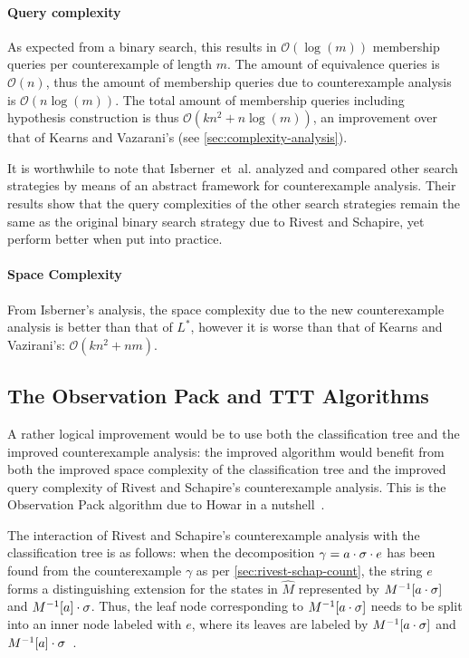\documentclass[multi,crop=false,class=article]{standalone}
\begin{document}
\paragraph{Query complexity} As expected from a binary search, this results in
$\mathcal{O}(\log(m))$ membership queries per counterexample of length $m$. The
amount of equivalence queries is $\mathcal{O}(n)$, thus the amount of membership
queries due to counterexample analysis is $\mathcal{O}(n\log(m))$. The total
amount of membership queries including hypothesis construction is thus
$\mathcal{O}(kn^2 + n\log(m))$, an improvement over that of Kearns and
Vazarani's (see \cref{sec:complexity-analysis}).

It is worthwhile to note that Isberner~et~al. analyzed and compared other search
strategies by means of an abstract framework for counterexample
analysis\cite{Isberner2014a}. Their results show that the query complexities of
the other search strategies remain the same as the original binary search
strategy due to Rivest and Schapire, yet perform better when put into practice.

\paragraph{Space Complexity} From Isberner's analysis\cite{Isberner2014b}, the
space complexity due to the new counterexample analysis is better than that of
$L^*$, however it is worse than that of Kearns and Vazirani's:
$\mathcal{O}(kn^2 + nm)$.

\subsection{The Observation Pack and TTT Algorithms}
\label{sec:ttt}
A rather logical improvement would be to use both the classification tree and
the improved counterexample analysis: the improved algorithm would benefit from
both the improved space complexity of the classification tree and the improved
query complexity of Rivest and Schapire's counterexample analysis. This is the
Observation Pack algorithm due to Howar in a
nutshell~\cite{Howar2012a,Isberner2015a}.

The interaction of Rivest and Schapire's counterexample analysis with the
classification tree is as follows: when the decomposition
$\gamma = a \cdot \sigma \cdot e$ has been found from the counterexample
$\gamma$ as per \cref{sec:rivest-schap-count}, the string $e$ forms a
distinguishing extension for the states in $\hat M$ represented by
$M^{-1}[a\cdot\sigma]$ and $M^{-1}[a]\cdot\sigma$. Thus, the leaf
node corresponding to $M^{-1}[a\cdot\sigma]$ needs to be split into an
inner node labeled with $e$, where its leaves are labeled by
$M^{-1}[a\cdot\sigma]$ and
$M^{-1}[a]\cdot\sigma$~\cite{Isberner2015a}.
\end{document}
